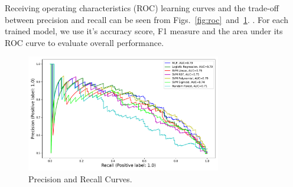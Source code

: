 Receiving operating characteristics (ROC) learning curves and the trade-off between precision and recall can be seen from Figs.~\ref{fig:roc}~and~\ref{fig:par}.
.
For each trained model, we use it's accuracy score, F1 measure and the area under its ROC curve to evaluate overall performance.


\begin{figure}[ht]
\includegraphics[width=8.5cm]{plots/parcurve.pdf}
\caption{Precision and Recall Curves.}

\label{fig:par}
\centering
\end{figure}


